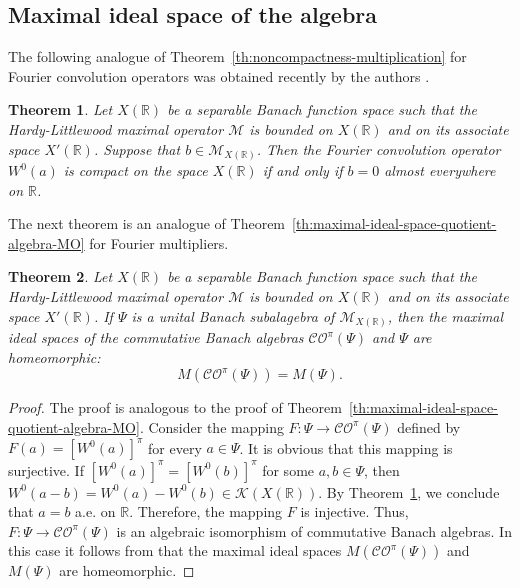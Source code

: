 \documentclass{birkjour}
\newtheorem{theorem}{Theorem}[section]
\numberwithin{equation}{section}
\newcommand{\R}{\mathbb{R}}
\newcommand{\cK}{\mathcal{K}}
\newcommand{\cM}{\mathcal{M}}
\begin{document}
\subsection{Maximal ideal space of the algebra
}
The following analogue of Theorem~\ref{th:noncompactness-multiplication}
for Fourier convolution operators was obtained recently by the authors
\cite[Theorem~1.1]{FKK-AFA}.
\begin{theorem}
\label{th:noncompactness-convolution}
Let $X(\R)$ be a separable Banach function space such that the
Hardy-Littlewood maximal operator $\cM$ is bounded on $X(\R)$ and on its
associate space $X'(\R)$. Suppose that $b\in\cM_{X(\R)}$. Then the Fourier
convolution operator $W^0(a)$ is compact on the space $X(\R)$ if and only
if $b=0$ almost everywhere on $\R$.
\end{theorem}
The next theorem is an analogue of
Theorem~\ref{th:maximal-ideal-space-quotient-algebra-MO}
for Fourier multipliers.
\begin{theorem}\label{th:maximal-ideal-space-quotient-algebra-CO}
Let $X(\R)$ be a separable Banach function space such that the Hardy-Littlewood
maximal operator $\cM$ is bounded on $X(\R)$ and on its associate space
$X'(\R)$. If $\Psi$ is a unital Banach subalagebra of
$\cM_{X(\R)}$, then the maximal ideal spaces of the commutative
Banach algebras $\mathcal{CO}^\pi(\Psi)$ and $\Psi$ are
homeomorphic:
\[
M(\mathcal{CO}^\pi(\Psi))=M(\Psi).
\]
\end{theorem}
\begin{proof}
The proof is analogous to the proof of
Theorem~\ref{th:maximal-ideal-space-quotient-algebra-MO}.
Consider the mapping $F:\Psi\to\mathcal{CO}^\pi(\Psi)$ defined
by $F(a)=[W^0(a)]^\pi$ for every $a\in\Psi$. It is obvious that this mapping
is surjective. If
$[W^0(a)]^\pi=[W^0(b)]^\pi$ for some $a,b\in\Psi$, then
$W^0(a-b)=W^0(a)-W^0(b)\in\cK(X(\R))$. By
Theorem~\ref{th:noncompactness-convolution},
we conclude that $a=b$ a.e. on $\R$. Therefore, the mapping $F$ is injective.
Thus, $F:\Psi\to\mathcal{CO}^\pi(\Psi)$ is an algebraic
isomorphism of commutative
Banach algebras. In this case it follows from \cite[Lemma~2.2.12]{K09}
that the maximal ideal spaces $M(\mathcal{CO}^\pi(\Psi))$ and
$M(\Psi)$ are homeomorphic.
\end{proof}
\end{document}
